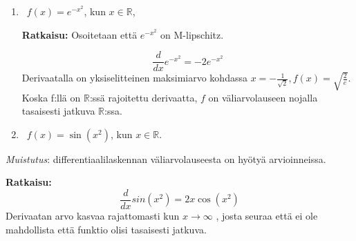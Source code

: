 \documentclass[12pt,a4paper,leqno]{amsart}
\begin{document}
\begin{enumerate}

\item \  $f(x) = e^{-x^2}$,  kun  $x \in \mathbb R$,

\textbf{Ratkaisu: }
Osoitetaan että $e^{-x^2}$ on M-lipschitz.

\[\frac{d}{dx} e^{-x^2} = -2 e^{-x^2}\]
Derivaatalla on yksiselitteinen maksimiarvo kohdassa $x = -\frac{1}{\sqrt{2}}, f(x) = \sqrt{\frac{2}{e}}$. Koska f:llä on $\mathbb{R}$:ssä rajoitettu derivaatta, $f$ on väliarvolauseen nojalla tasaisesti jatkuva $\mathbb{R}$:ssa.



\item \  $f(x) = \sin(x^2)$, kun   $x \in \mathbb  R$.

\end{enumerate}

\noindent \textit{Muistutus}: differentiaalilaskennan väliarvolauseesta on hyötyä arvioinneissa.

\textbf{Ratkaisu: }
\[\frac{d}{dx} sin(x^2) = 2 x \cos (x^2)\]
Derivaatan arvo kasvaa rajattomasti kun $x \to \infty$ , josta seuraa että ei ole mahdollista että funktio olisi tasaisesti jatkuva.


\bigskip

\begin{comment}
    
Kaikissa tehtävissä vastaukset tulee \textbf{perustella}. Pelkkä vastaus ei riitä pisteisiin, ellei tehtävässä erityisesti niin mainita.
Tehtävien arvostelussa käytetään seuraavaa asteikkoa: 
\begin{itemize}
\item [0 p.] Ei ratkaisua tai ratkaisussa ei oikeita elementtejä.
\item [1 p.] Ratkaisussa oikeita elementtejä, mutta kokonaisuutena puutteellinen tai vain osa tehtävästä on ratkaistu.
\item [2 p.] Ratkaisu (lähes) oikein.
\end{itemize}

\end{comment}
\end{document}
